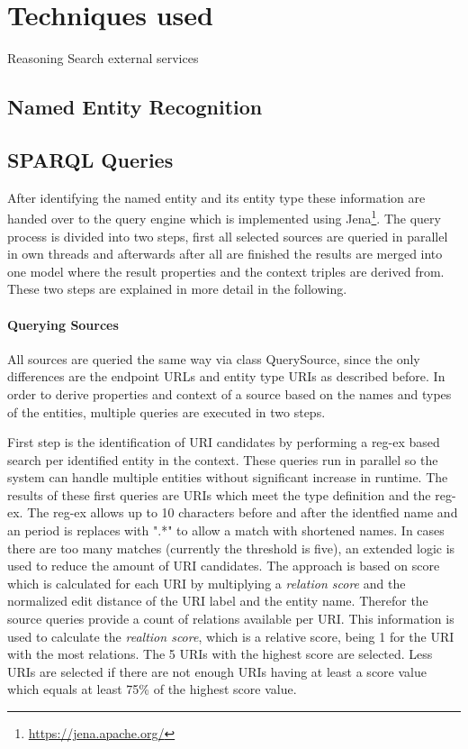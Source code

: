 \documentclass[11pt,titlepage,oneside,openany]{article}
\begin{document}
\section{Techniques used} 
Reasoning
Search
external services
\subsection{Named Entity Recognition}

\subsection{SPARQL Queries}
After identifying the named entity and its entity type these information are handed over to the query engine which is implemented using Jena\footnote{\url{https://jena.apache.org/}}. The query process is divided into two steps, first all selected sources are queried in parallel in own threads and afterwards after all are finished the results are merged into one model where the result properties and the context triples are derived from. These two steps are explained in more detail in the following.
\paragraph{Querying Sources}
All sources are queried the same way via class QuerySource, since the only differences are the endpoint URLs and entity type URIs as described before. In order to derive properties and context of a source based on the names and types of the entities, multiple queries are executed in two steps.

First step is the identification of URI candidates by performing a reg-ex based search per identified entity in the context. These queries run in parallel so the system can handle multiple entities without significant increase in runtime. The results of these first queries are URIs which meet the type definition and the reg-ex. The reg-ex allows up to 10 characters before and after the identfied name and an period is replaces with ".*" to allow a match with shortened names. In cases there are too many matches (currently the threshold is five), an extended logic is used to reduce the amount of URI candidates. 
The approach is based on score which is calculated for each URI by multiplying a \textit{relation score} and the normalized edit distance of the URI label and the entity name. Therefor the source queries provide a count of relations available per URI. This information is used to calculate the \textit{realtion score}, which is a relative score, being 1 for the URI with the most relations. The 5 URIs with the highest score are selected. Less URIs are selected if there are not enough URIs having at least a score value which equals at least 75\% of the highest score value.
\end{document}
